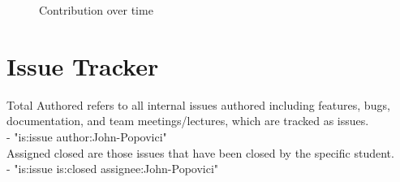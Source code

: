 \documentclass{article}
\begin{document}

\begin{figure}[H]
\centering
\caption{Contribution over time}
\end{figure}


\newpage
\section{Issue Tracker}


Total Authored refers to all internal issues authored including features, bugs, documentation, and team meetings/lectures, which are tracked as issues.\\
- "is:issue author:John-Popovici"\\

\noindent
Assigned closed are those issues that have been closed by the specific student.\\
- "is:issue is:closed assignee:John-Popovici"\\
\end{document}
